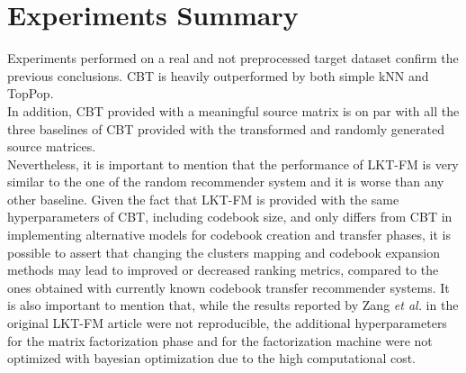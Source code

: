 \clearpage



\section{Experiments Summary}

Experiments performed on a real and not preprocessed target dataset confirm the previous conclusions. CBT is heavily outperformed by both simple kNN and TopPop.\\
In addition, CBT provided with a meaningful source matrix is on par with all the three baselines of CBT provided with the transformed and randomly generated source matrices.\\
Nevertheless, it is important to mention that the performance of LKT-FM is very similar to the one of the random recommender system and it is worse than any other baseline. Given the fact that LKT-FM is provided with the same hyperparameters of CBT, including codebook size, and only differs from CBT in implementing alternative models for codebook creation and transfer phases, it is possible to assert that changing the clusters mapping and codebook expansion methods may lead to improved or decreased ranking metrics, compared to the ones obtained with currently known codebook transfer recommender systems. It is also important to mention that, while the results reported by Zang \textit{et al.} in the original LKT-FM article \cite{10.1007/978-3-319-71246-8_39} were not reproducible, the additional hyperparameters for the matrix factorization phase and for the factorization machine were not optimized with bayesian optimization due to the high computational cost.